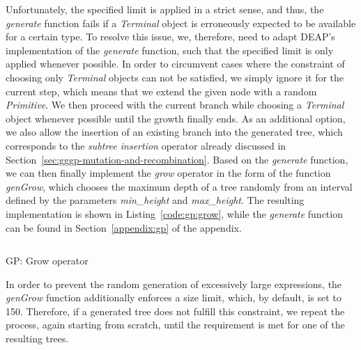 Unfortunately, the specified limit is applied in a strict sense, and thus, the \emph{generate} function fails if a \emph{Terminal} object is erroneously expected to be available for a certain type.
To resolve this issue, we, therefore, need to adapt DEAP's implementation of the \emph{generate} function, such that the specified limit is only applied whenever possible.
In order to circumvent cases where the constraint of choosing only \emph{Terminal} objects can not be satisfied, we simply ignore it for the current step, which means that we extend the given node with a random \emph{Primitive}.
We then proceed with the current branch while choosing a \emph{Terminal} object whenever possible until the growth finally ends.
As an additional option, we also allow the insertion of an existing branch into the generated tree, which corresponds to the \emph{subtree insertion} operator already discussed in Section~\ref{sec:gggp-mutation-and-recombination}.
Based on the \emph{generate} function, we can then finally implement the \emph{grow} operator in the form of the function \emph{genGrow}, which chooses the maximum depth of a tree randomly from an interval defined by the parameters \emph{min\_height} and \emph{max\_height}.
The resulting implementation is shown in Listing~\ref{code:gp:grow}, while the \emph{generate} function can be found in Section~\ref{appendix:gp} of the appendix.
\begin{listing}[!htb]
	\inputminted{python}{evostencils/gp/grow.py}
	\caption{GP: Grow operator}
	\label{code:gp:grow}
\end{listing}
In order to prevent the random generation of excessively large expressions, the \emph{genGrow} function additionally enforces a size limit, which, by default, is set to 150.
Therefore, if a generated tree does not fulfill this constraint, we repeat the process, again starting from scratch, until the requirement is met for one of the resulting trees.

